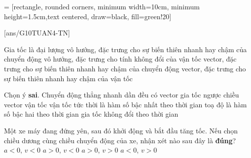  = [rectangle, rounded corners, minimum width=10cm, minimum height=1.5cm,text centered, draw=black, fill=green!20]
\begin{center}
\end{center}
\setcounter{section}{0}
[ans/G10TUAN4-TN]
\begin{ex}
	Gia tốc là đại lượng
	\choice
	{vô hướng, đặc trưng cho sự biến thiên nhanh hay chậm của chuyển động}
	{vô hướng, đặc trưng cho tính không đổi của vận tốc}
	{vector, đặc trưng cho sự biến thiên nhanh hay chậm của chuyển động}
	{\True vector, đặc trưng cho sự biến thiên nhanh hay chậm của vận tốc}
	\loigiai{}
\end{ex}
\begin{ex}
	Chọn ý \textbf{sai}. Chuyển động thẳng nhanh dần đều có
	\choice
	{\True vector gia tốc ngược chiều vector vận tốc}
	{vận tốc tức thời là hàm số bậc nhất theo thời gian}
	{toạ độ là hàm số bậc hai theo thời gian}
	{gia tốc không đổi theo thời gian}
	\loigiai{}
\end{ex}
\begin{ex}
	Một xe máy đang đứng yên, sau đó khởi động và bắt đầu tăng tốc. Nếu chọn chiều dương cùng chiều chuyển động của xe, nhận xét nào sau đây là \textbf{đúng}? 
	\choice
	{$a<0$, $v<0$}
	{$a>0$, $v<0$}
	{\True $a>0$, $v>0$}
	{$a<0$, $v>0$}
	\loigiai{}
\end{ex}

